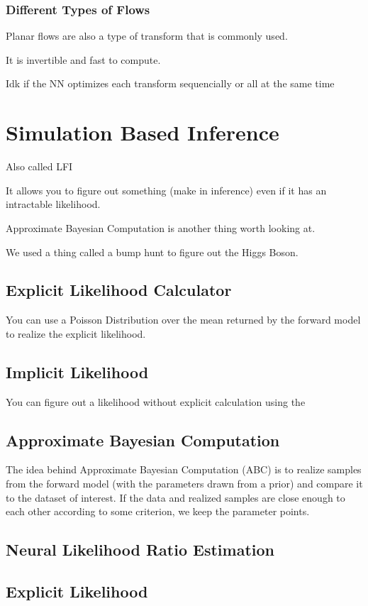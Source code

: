 \documentclass[fleqn]{report}
\begin{document}
\subsection{Different Types of Flows}
Planar flows are also a type of transform that is commonly used. 

It is invertible and fast to compute. 

Idk if the NN optimizes each transform sequencially or all 
at the same time 

\chapter{Simulation Based Inference}
Also called LFI 

It allows you to figure out something (make in inference) 
even if it has an intractable likelihood. 

Approximate Bayesian Computation is another thing worth looking at. 

We used a thing called a bump hunt to figure out the Higgs Boson. 

\section{Explicit Likelihood Calculator}
You can use a Poisson Distribution over the mean returned by the 
forward model to realize the explicit likelihood. 

\section{Implicit Likelihood}
You can figure out a likelihood without explicit calculation using the 

\section{Approximate Bayesian Computation}
The idea behind Approximate Bayesian Computation (ABC) is to realize samples 
from the forward model (with the parameters
drawn from a prior) and compare it to the dataset of interest. 
If the data and realized samples are close enough to each other according 
to some criterion, we keep the parameter points.

\section{Neural Likelihood Ratio Estimation}

\section{Explicit Likelihood}
\end{document}
